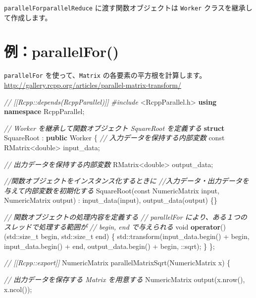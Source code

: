 \documentclass[]{book}
\newenvironment{Shaded}{\begin{snugshade}}{\end{snugshade}}
\newcommand{\AttributeTok}[1]{\textcolor[rgb]{0.77,0.63,0.00}{#1}}
\newcommand{\BuiltInTok}[1]{#1}
\newcommand{\CommentTok}[1]{\textcolor[rgb]{0.56,0.35,0.01}{\textit{#1}}}
\newcommand{\DataTypeTok}[1]{\textcolor[rgb]{0.13,0.29,0.53}{#1}}
\newcommand{\ImportTok}[1]{#1}
\newcommand{\KeywordTok}[1]{\textcolor[rgb]{0.13,0.29,0.53}{\textbf{#1}}}
\newcommand{\NormalTok}[1]{#1}
\newcommand{\PreprocessorTok}[1]{\textcolor[rgb]{0.56,0.35,0.01}{\textit{#1}}}
\begin{document}
\texttt{parallelFor\textasciigrave{}\textasciigrave{}parallelReduce} に渡す関数オブジェクトは \texttt{Worker} クラスを継承して作成します。

\hypertarget{parallelfor}{%
\section{例：parallelFor()}\label{parallelfor}}

\texttt{parallelFor} を使って、\texttt{Matrix} の各要素の平方根を計算します。
\url{http://gallery.rcpp.org/articles/parallel-matrix-transform/}

\begin{Shaded}
\begin{Highlighting}[]
\CommentTok{// [[Rcpp::depends(RcppParallel)]]}
\PreprocessorTok{#include }\ImportTok{<RcppParallel.h>}
\KeywordTok{using} \KeywordTok{namespace}\NormalTok{ RcppParallel;}

\CommentTok{// Worker を継承して関数オブジェクト SquareRoot を定義する}
\KeywordTok{struct}\NormalTok{ SquareRoot : }\KeywordTok{public}\NormalTok{ Worker}
\NormalTok{\{}
  \CommentTok{// 入力データを保持する内部変数}
  \AttributeTok{const}\NormalTok{ RMatrix<}\DataTypeTok{double}\NormalTok{> input_data;}
  
  \CommentTok{// 出力データを保持する内部変数}
\NormalTok{  RMatrix<}\DataTypeTok{double}\NormalTok{> output_data;}
  
  \CommentTok{//関数オブジェクトをインスタンス化するときに}
  \CommentTok{//入力データ・出力データを与えて内部変数を初期化する}
\NormalTok{  SquareRoot(}\AttributeTok{const}\NormalTok{ NumericMatrix input, NumericMatrix output) }
\NormalTok{    : input_data(input), output_data(output) \{\}}
  
  \CommentTok{// 関数オブジェクトの処理内容を定義する}
  \CommentTok{// parallelFor により、ある１つのスレッドで処理する範囲が}
  \CommentTok{// begin, end で与えられる }
  \DataTypeTok{void} \KeywordTok{operator}\NormalTok{()(}\BuiltInTok{std::}\NormalTok{size_t begin, }\BuiltInTok{std::}\NormalTok{size_t end) \{}
    \BuiltInTok{std::}\NormalTok{transform(input_data.begin() + begin,}
\NormalTok{                   input_data.begin() + end, }
\NormalTok{                   output_data.begin() + begin, }
\NormalTok{                   ::sqrt);}
\NormalTok{  \}}
\NormalTok{\};}


\CommentTok{// [[Rcpp::export]]}
\NormalTok{NumericMatrix parallelMatrixSqrt(NumericMatrix x) \{}
  
  \CommentTok{// 出力データを保存する Matrix を用意する}
\NormalTok{  NumericMatrix output(x.nrow(), x.ncol());}
  

\end{Highlighting}
\end{Shaded}
\end{document}
